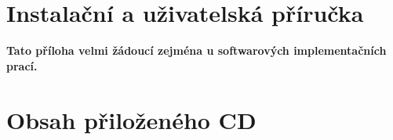 \documentclass[11pt,twoside,a4paper]{book}
\begin{document}
\chapter{Instalační a uživatelská příručka}
\textbf{\large Tato příloha velmi žádoucí zejména u softwarových implementačních prací.}

\chapter{Obsah přiloženého CD}
\end{document}
